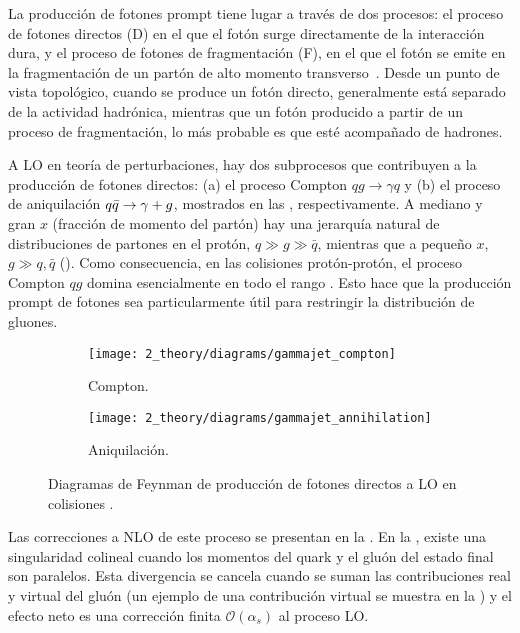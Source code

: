 La producción de fotones prompt tiene lugar a través de dos procesos: el proceso de fotones directos (D) en el que el fotón surge directamente de la interacción dura, y el proceso de fotones de fragmentación (F), en el que el fotón se emite en la fragmentación de un partón de alto momento transverso~\cite{Szczurek_Pietrycki-2007,Belghobsi_Fontannaz-2009}. Desde un punto de vista topológico, cuando se produce un fotón directo, generalmente está separado de la actividad hadrónica, mientras que un fotón producido a partir de un proceso de fragmentación, lo más probable es que esté acompañado de hadrones.

A \ac{LO} en teoría de perturbaciones, hay dos subprocesos que contribuyen a la producción de fotones directos: (a) el proceso Compton \(qg \to \gamma q\) y (b) el proceso de aniquilación \(q\bar{q} \rightarrow \gamma+g\), mostrados en las \Figs{\ref{fig:theory:sm:prompt_photon:feynman_lo_direct:compton}}{\ref{fig:theory:sm:prompt_photon:feynman_lo_direct:annihilation}}, respectivamente. A mediano y gran \(x\) (fracción de momento del partón) hay una jerarquía natural de distribuciones de partones en el protón, \(q \gg g \gg \bar{q}\), mientras que a pequeño \(x\), \(g \gg q,\bar{q}\) (\Fig{\ref{fig:theory:sm:hadron_interactions:pdfs}}). Como consecuencia, en las colisiones protón-protón, el proceso Compton \(qg\) domina esencialmente en todo el rango \pt. Esto hace que la producción prompt de fotones sea particularmente útil para restringir la distribución de gluones.

\begin{figure}[ht!]
    \centering
    \begin{subfigure}[h]{0.49\linewidth}
        \centering
        \texttt{[image: 2\_theory/diagrams/gammajet\_compton]}
        \caption{Compton.}
        \label{fig:theory:sm:prompt_photon:feynman_lo_direct:compton}
    \end{subfigure}
    \hfill
    \begin{subfigure}[h]{0.49\linewidth}
        \centering
        \texttt{[image: 2\_theory/diagrams/gammajet\_annihilation]}
        \caption{Aniquilación.}
        \label{fig:theory:sm:prompt_photon:feynman_lo_direct:annihilation}
    \end{subfigure}
    \caption{Diagramas de Feynman de producción de fotones directos a \ac{LO} en colisiones \pp.}
    \label{fig:theory:sm:prompt_photon:feynman_lo_direct}
\end{figure}

Las correcciones a \ac{NLO} de este proceso se presentan en la \Fig{\ref{fig:theory:sm:prompt_photon:feynman_nlo_direct}}. En la \Fig{\ref{fig:theory:sm:prompt_photon:feynman_nlo_direct:gluon}}, existe una singularidad colineal cuando los momentos del quark y el gluón del estado final son paralelos. Esta divergencia se cancela cuando se suman las contribuciones real y virtual del gluón (un ejemplo de una contribución virtual se muestra en la \Fig{\ref{fig:theory:sm:prompt_photon:feynman_nlo_direct:gluon_virtual}}) y el efecto neto es una corrección finita \(\mathcal{O}(\alpha_s)\) al proceso \ac{LO}.

